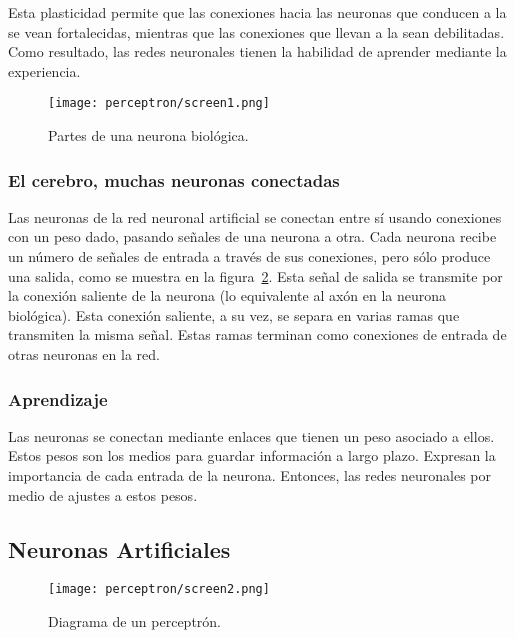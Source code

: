 Esta plasticidad permite que las conexiones hacia las neuronas que conducen a la  se vean fortalecidas, mientras que las conexiones que llevan a la  sean debilitadas. Como resultado, las redes neuronales tienen la habilidad de aprender mediante la experiencia.

\begin{figure}
  \centering
  \texttt{[image: perceptron/screen1.png]}
  \caption{Partes de una neurona biológica. \parencite[166]{Nengnevitsky2005}}
  \label{fig:P9screen1}
\end{figure}

\subsubsection{El cerebro, muchas neuronas conectadas}

\noindent Las neuronas de la red neuronal artificial se conectan entre sí usando conexiones con un peso dado, pasando señales de una neurona a otra. Cada neurona recibe un número de señales de entrada a través de sus conexiones, pero sólo produce una salida, como se muestra en la figura~\ref{fig:P9screen2}. Esta señal de salida se transmite por la conexión saliente de la neurona (lo equivalente al axón en la neurona biológica). Esta conexión saliente, a su vez, se separa en varias ramas que transmiten la misma señal. Estas ramas terminan como conexiones de entrada de otras neuronas en la red.

\subsubsection{Aprendizaje}

\noindent Las neuronas se conectan mediante enlaces que tienen un peso asociado a ellos. Estos pesos son los medios para guardar información a largo plazo. Expresan la importancia de cada entrada de la neurona. Entonces, las redes neuronales  por medio de ajustes a estos pesos.


\subsection{Neuronas Artificiales}

\begin{figure}[ht]
  \centering
  \texttt{[image: perceptron/screen2.png]}
  \caption{Diagrama de un perceptrón. \parencite[168]{Nengnevitsky2005}}
  \label{fig:P9screen2}
\end{figure}

